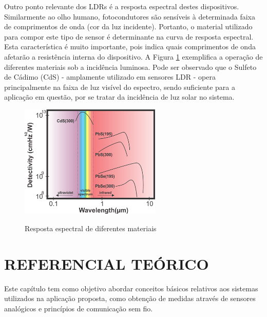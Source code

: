 \documentclass[oneside,openright,12pt]{ufsm_2015} %
\begin{document}
Outro ponto relevante dos LDRs é a resposta espectral destes dispositivos. Similarmente ao olho humano, fotocondutores são sensíveis à determinada faixa de comprimentos de onda (cor da luz incidente). Portanto, o material utilizado para compor este tipo de sensor é determinante na curva de resposta espectral. Esta característica é muito importante, pois indica quais comprimentos de onda afetarão a resistência interna do dispositivo. A Figura \ref{fig:wavelength} exemplifica a operação de diferentes materiais sob a incidência luminosa. Pode ser observado que o Sulfeto de Cádimo (CdS) - amplamente utilizado em sensores LDR - opera principalmente na faixa de luz visível do espectro, sendo suficiente para a aplicação em questão, por se tratar da incidência de luz solar no sistema.
\begin{figure}[H]
    \caption{\label{exepretex} Resposta espectral de diferentes materiais}
    \centering
    \includegraphics[width=0.6\textwidth]{figuras/wavelength-detectivity.png}
    \vspace{\baselineskip} %
        \label{fig:wavelength}
\end{figure}



\chapter{REFERENCIAL TEÓRICO}
Este capítulo tem como objetivo abordar conceitos básicos relativos aos sistemas utilizados na aplicação proposta, como obtenção de medidas através de sensores analógicos e princípios de comunicação sem fio.
\end{document}
